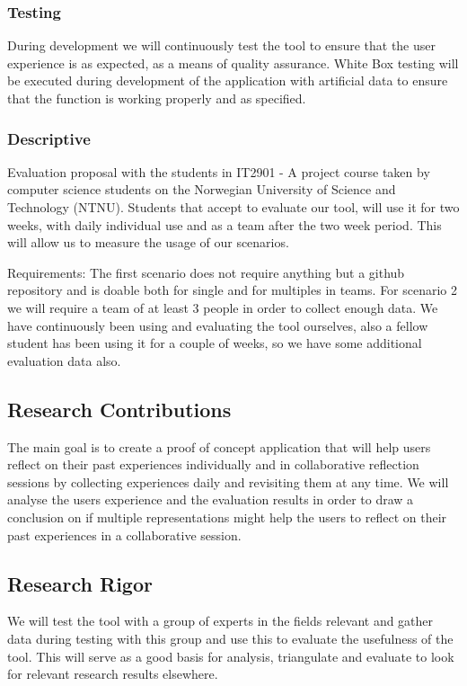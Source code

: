 \subsubsection{Testing}
During development we will continuously test the tool  to ensure that the user experience is as expected, as a means of quality assurance.
White Box testing will be executed during development of the application with artificial data to ensure that the function is working properly and as specified. 

\subsubsection{Descriptive}
Evaluation proposal with the students in IT2901 - A project course taken by computer science students on the Norwegian University of Science and Technology (NTNU). 
Students that accept to evaluate our tool, will use it for two weeks, with daily individual use and as a team after the two week period. This will allow us to measure the usage of our scenarios. 

Requirements: 
The first scenario does not require anything but a github repository and is doable both for single and for multiples in teams.
For scenario 2 we will require a team of at least 3 people in order to collect enough data. 
We have continuously been using and evaluating the tool ourselves, also a fellow student has been using it for a couple of weeks, so we have some additional evaluation
data also.

\subsection{Research Contributions}
The main goal is to create a proof of concept application that will help users reflect on their past experiences individually and in collaborative reflection sessions by collecting experiences daily and revisiting them at any time. We will analyse the users experience and the evaluation results  in order to draw a conclusion on if multiple representations might help the users to reflect on their past experiences in a collaborative session.

\subsection{Research Rigor}
We will test the tool with a group of experts in the fields relevant and gather data during testing with this group and use this to evaluate the usefulness of the tool. This will serve as a good basis for analysis, triangulate and evaluate to look for relevant research results elsewhere.

